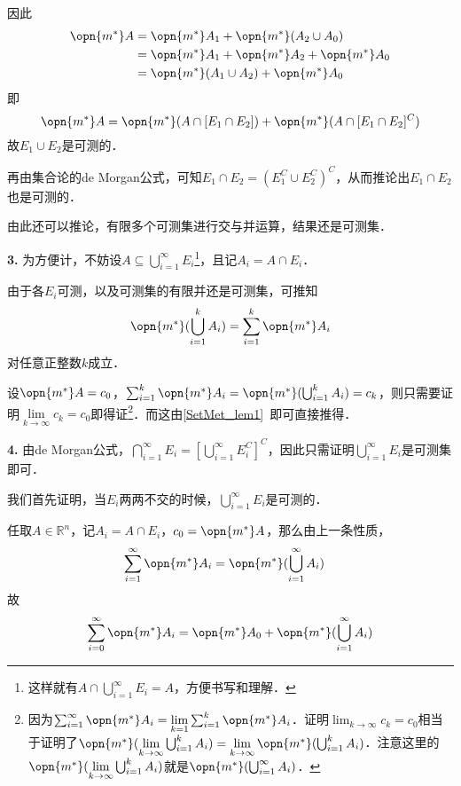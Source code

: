 因此
\begin{equation}
\begin{aligned}
\opn{m^*}A&=\opn{m^*}A_1+\opn{m^*}(A_2\cup A_0)\\
&=\opn{m^*}A_1+\opn{m^*}A_2+\opn{m^*}A_0\\
&=\opn{m^*}(A_1\cup A_2)+\opn{m^*}A_0
\end{aligned}
\end{equation}
即
\begin{equation}
\opn{m^*}A=\opn{m^*}(A\cap [E_1\cap E_2])+\opn{m^*}(A\cap [E_1\cap E_2]^C)
\end{equation}
故$E_1\cup E_2$是可测的．

再由集合论的de Morgan公式，可知$E_1\cap E_2=(E_1^C\cup E_2^C)^C$，从而推论出$E_1\cap E_2$也是可测的．

由此还可以推论，有限多个可测集进行交与并运算，结果还是可测集．

\textbf{3.} 为方便计，不妨设$A\subseteq \bigcup_{i=1}^\infty E_i$\footnote{这样就有$A\cap \bigcup_{i=1}^{\infty}E_i=A$，方便书写和理解．}，且记$A_i=A\cap E_i$．

由于各$E_i$可测，以及可测集的有限并还是可测集，可推知
\begin{equation}
\opn{m^*}(\bigcup_{i=1}^k A_i)=\sum_{i=1}^k \opn{m^*}A_i
\end{equation}
对任意正整数$k$成立．

设$\opn{m^*}A=c_0$，$\sum_{i=1}^k \opn{m^*}A_i=\opn{m^*}(\bigcup_{i=1}^k A_i)=c_k$，则只需要证明$\lim\limits_{k\to \infty}c_k=c_0$即得证\footnote{因为$\sum_{i=1}^\infty \opn{m^*}A_i=\lim\limits_{k=1}\sum_{i=1}^k\opn{m^*}A_i$．证明$\lim_{k\to\infty}c_k=c_0$相当于证明了$\opn{m^*}(\lim\limits_{k\to\infty}\bigcup^k_{i=1}A_i)=\lim\limits_{k\to\infty}\opn{m^*}(\bigcup^k_{i=1}A_i)$．注意这里的$\opn{m^*}(\lim\limits_{k\to\infty}\bigcup^k_{i=1}A_i)$就是$\opn{m^*}(\bigcup^\infty_{i=1}A_i)$．}．而这由\autoref{SetMet_lem1}~即可直接推得．%

\textbf{4.} 由de Morgan公式，$\bigcap_{i=1}^\infty E_i=[\bigcup_{i=1}^\infty E_i^C]^C$，因此只需证明$\bigcup_{i=1}^\infty E_i$是可测集即可．

我们首先证明，当$E_i$两两不交的时候，$\bigcup^\infty_{i=1}E_i$是可测的．

任取$A\in\mathbb{R}^n$，记$A_i=A\cap E_i$，$c_0=\opn{m^*}A$，那么由上一条性质，
\begin{equation}
\begin{aligned}
\sum^\infty_{i=1}\opn{m^*}A_i&=\opn{m^*}(\bigcup_{i=1}^\infty A_i)
\end{aligned}
\end{equation}
故
\begin{equation}\label{MsbSet_eq2}
\sum^\infty_{i=0}\opn{m^*}A_i=\opn{m^*}A_0+\opn{m^*}(\bigcup_{i=1}^\infty A_i)
\end{equation}


